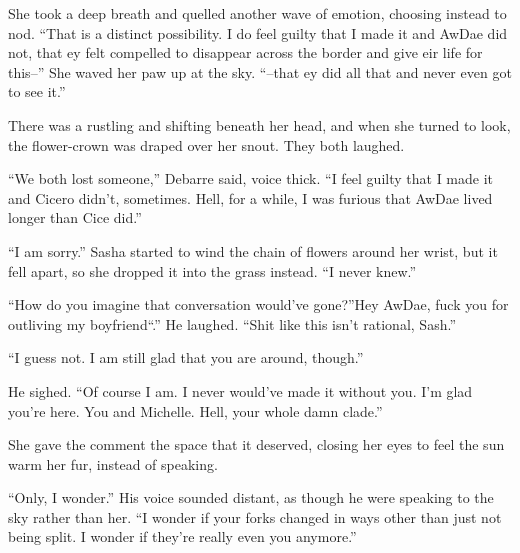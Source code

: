She took a deep breath and quelled another wave of emotion, choosing instead to nod. ``That is a distinct possibility. I do feel guilty that I made it and AwDae did not, that ey felt compelled to disappear across the border and give eir life for this--'' She waved her paw up at the sky. ``--that ey did all that and never even got to see it.''

There was a rustling and shifting beneath her head, and when she turned to look, the flower-crown was draped over her snout. They both laughed.

``We both lost someone,'' Debarre said, voice thick. ``I feel guilty that I made it and Cicero didn't, sometimes. Hell, for a while, I was furious that AwDae lived longer than Cice did.''

``I am sorry.'' Sasha started to wind the chain of flowers around her wrist, but it fell apart, so she dropped it into the grass instead. ``I never knew.''

``How do you imagine that conversation would've gone?''Hey AwDae, fuck you for outliving my boyfriend``.'' He laughed. ``Shit like this isn't rational, Sash.''

``I guess not. I am still glad that you are around, though.''

He sighed. ``Of course I am. I never would've made it without you. I'm glad you're here. You and Michelle. Hell, your whole damn clade.''

She gave the comment the space that it deserved, closing her eyes to feel the sun warm her fur, instead of speaking.

``Only, I wonder.'' His voice sounded distant, as though he were speaking to the sky rather than her. ``I wonder if your forks changed in ways other than just not being split. I wonder if they're really even you anymore.''
